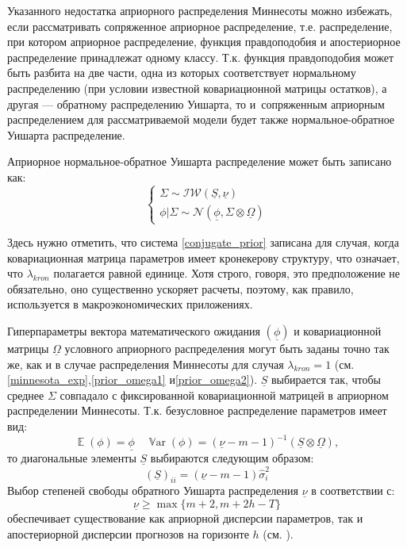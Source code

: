 \documentclass[11pt]{article} %
\DeclareMathOperator{\E}{\mathbb{E}}
\DeclareMathOperator{\Var}{\mathbb{V}\mathrm{ar}}
\newcommand{\cN}{\mathcal{N}}
\newcommand{\cIW}{\mathcal{IW}}
\newcommand{\prior}{\underline}
\begin{document}
Указанного недостатка априорного распределения Миннесоты можно избежать, если рассматривать сопряженное априорное распределение, т.е. распределение, при котором  априорное распределение, функция правдоподобия и апостериорное распределение принадлежат одному классу. Т.к. функция правдоподобия может быть разбита на две части, одна из которых соответствует нормальному распределению (при условии известной ковариационной матрицы остатков), а другая --- обратному распределению Уишарта, то и~сопряженным априорным распределением для рассматриваемой модели будет также нормальное-обратное Уишарта распределение.


Априорное нормальное-обратное Уишарта распределение может быть записано как:
\begin{equation}
\begin{cases} \label{conjugate_prior}
\Sigma\sim \cIW(\prior S, \prior \nu) \\
\phi|\Sigma\sim \cN (\prior \phi, \Sigma\otimes\prior \Omega)
\end{cases} 
\end{equation}

Здесь нужно отметить, что система \eqref{conjugate_prior} записана для случая, когда ковариационная матрица параметров имеет кронекерову структуру, что означает, что $\lambda_{kron}$ полагается равной единице. Хотя строго, говоря, это предположение не обязательно, оно существенно ускоряет расчеты, поэтому, как правило, используется в макроэкономических  приложениях. 

Гиперпараметры вектора математического ожидания $(\prior \phi)$ и ковариационной матрицы $\prior \Omega$ условного априорного распределения  могут быть заданы точно так же, как и в случае распределения Миннесоты для  случая $\lambda_{kron} =1$ (см. \eqref{minnesota_exp},\eqref{prior_omega1} и\eqref{prior_omega2}). 
$\prior S$ выбирается так, чтобы среднее $\Sigma$ совпадало с фиксированной ковариационной матрицей в априорном распределении Миннесоты. Т.к. безусловное распределение параметров имеет вид:
\begin{equation}
\E(\phi)=\prior \phi \quad \Var(\phi)=(\prior \nu - m -1)^{-1}(\prior S\otimes \prior \Omega),
\end{equation}
то диагональные элементы $\prior S$ выбираются следующим образом:
\begin{equation}
(\prior S)_{ii}= (\prior \nu- m- 1) \hat\sigma^2_{i}
\end{equation}
Выбор степеней свободы обратного Уишарта распределения $\prior\nu$ в соответствии с: 
\begin{equation}
\prior \nu \geq\max\lbrace m+2, m+2h-T\rbrace
\end{equation}
обеспечивает существование как априорной дисперсии параметров, так и апостериорной дисперсии прогнозов на горизонте $h$ (см. \cite{kadiala_karlsson_1997_estimation}).
\end{document}

